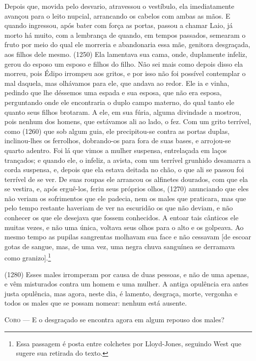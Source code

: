 Depois que, movida pelo desvario, atravessou o vestíbulo, ela
imediatamente avançou para o leito nupcial, arrancando os cabelos com
ambas as mãos. E quando ingressou, após bater com força as portas,
passou a chamar Laio, já morto há muito, com a lembrança de quando, em
tempos passados, semearam o fruto por meio do qual ele morreria e
abandonaria essa mãe, genitora desgraçada, aos filhos dele mesmo. (1250)
Ela lamentava sua cama, onde, duplamente infeliz, gerou do esposo um
esposo e filhos do filho. Não sei mais como depois disso ela morreu,
pois Édipo irrompeu aos gritos, e por isso não foi possível contemplar o
mal daquela, mas olhávamos para ele, que andava ao redor. Ele ia e
vinha, pedindo que lhe déssemos uma espada e sua esposa, que não era
esposa, perguntando onde ele encontraria o duplo campo materno, do qual
tanto ele quanto seus filhos brotaram. A ele, em sua fúria, alguma
divindade a mostrou, pois nenhum dos homens, que estávamos ali ao lado,
o fez. Com um grito terrível, como (1260) que sob algum guia, ele
precipitou-se contra as portas duplas, inclinou-lhes os ferrolhos,
dobrando-os para fora de suas bases, e arrojou-se quarto adentro. Foi lá
que vimos a mulher suspensa, entrelaçada em laços trançados; e quando
ele, o infeliz, a avista, com um terrível grunhido desamarra a corda
suspensa, e, depois que ela estava deitada no chão, o que ali se passou
foi terrível de se ver. De suas roupas ele arrancou os alfinetes
dourados, com que ela se vestira, e, após erguê-los, feriu seus próprios
olhos, (1270) anunciando que eles não veriam os sofrimentos que ele
padecia, nem os males que praticara, mas que pelo tempo restante
haveriam de ver na escuridão os que não deviam, e não conhecer os que
ele desejava que fossem conhecidos. A entoar tais cânticos ele muitas
vezes, e não uma única, voltava seus olhos para o alto e os golpeava. Ao
mesmo tempo as pupilas sangrentas molhavam sua face e não cessavam {[}de
escoar gotas de sangue, mas, de uma vez, uma negra chuva sanguínea se
derramava como granizo{]}.\footnote{Essa passagem é posta entre colchetes
  por Lloyd-Jones, seguindo West que sugere sua retirada do texto.}

(1280) Esses males irromperam por causa de duas pessoas, e não de uma
apenas, e vêm misturados contra um homem e uma mulher. A antiga
opulência era antes justa opulência, mas agora, neste dia, é lamento,
desgraça, morte, vergonha e todos os males que se possam nomear: nenhum
está ausente.

\textsc{Coro} --- E o desgraçado se encontra agora em algum repouso dos males?

